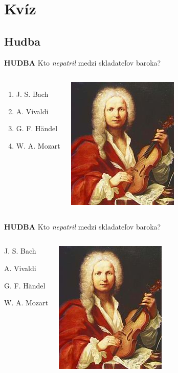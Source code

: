 \documentclass[dvipsnames]{beamer}
\begin{document}
\section{Kvíz}
\frame{\sectionpage}
\begin{frame}
	\subsection{Hudba}
	\textbf{HUDBA}
	\vskip 3mm
	Kto \textit{nepatril} medzi skladateľov baroka?
	\begin{columns}
		\begin{enumerate}
			\item J. S. Bach
			\item A. Vivaldi
			\item G. F. Händel
			\item W. A. Mozart
		\end{enumerate}
		\includegraphics[scale=1.75]{vivaldi}

	\end{columns}
\end{frame}
\begin{frame}
	\textbf{HUDBA}
	\vskip 3mm
	Kto \textit{nepatril} medzi skladateľov baroka?
	\begin{columns}
		\column{0.5\textwidth}

		\begin{enumerate}
			\item J. S. Bach
			\item A. Vivaldi
			\item G. F. Händel
			      \textcolor{g}{\item[\textcolor{g}{4.}] W. A. Mozart}
		\end{enumerate}
		\column{0.5\textwidth}
		\includegraphics[scale=1.75]{vivaldi}

	\end{columns}

\end{frame}
\end{document}
